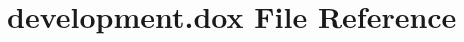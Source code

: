 \hypertarget{development_8dox}{}\section{development.\+dox File Reference}
\label{development_8dox}
